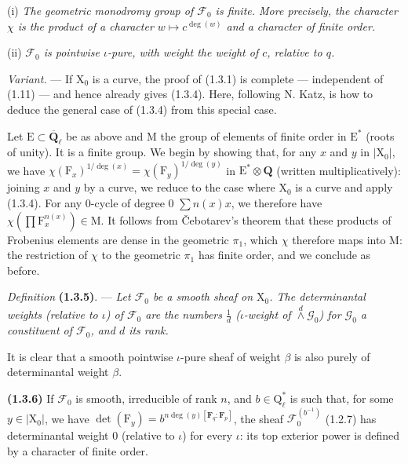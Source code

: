 \documentclass[11pt,leqno]{article}
\begin{document}
(i) \textit{The geometric monodromy group of \(\mathscr{F}_0\) is finite. More precisely, the character \(\chi\) is the product of a character \(w\mapsto c^{\deg(w)}\) and a character of finite order.}

(ii) \textit{\(\mathscr{F}_0\) is pointwise \(\iota\)-pure, with weight the weight of \(c\), relative to \(q\).}

\textit{Variant.} — If \(\mathrm{X}_0\) is a curve, the proof of (1.3.1) is complete — independent of (1.11) — and hence already gives (1.3.4). Here, following N. Katz, is how to deduce the general case of (1.3.4) from this special case.

Let \(\mathrm{E}\subset\overline{\mathbf{Q}}_\ell\) be as above and \(\mathrm{M}\) the group of elements of finite order in \(\mathrm{E}^*\) (roots of unity). It is a finite group. We begin by showing that, for any \(x\) and \(y\) in \(|\mathrm{X}_0|\), we have \(\chi(\mathrm{F}_x)^{1/\deg(x)}=\chi(\mathrm{F}_y)^{1/\deg(y)}\) in \(\mathrm{E}^*\otimes\mathbf{Q}\) (written multiplicatively): joining \(x\) and \(y\) by a curve, we reduce to the case where \(\mathrm{X}_0\) is a curve and apply (1.3.4). For any \(0\)-cycle of degree \(0\) \(\sum n(x)x\), we therefore have \(\chi(\prod\mathrm{F}_x^{n(x)})\in\mathrm{M}\). It follows from Čebotarev's theorem that these products of Frobenius elements are dense in the geometric \(\pi_1\), which \(\chi\) therefore maps into \(\mathrm{M}\): the restriction of \(\chi\) to the geometric \(\pi_1\) has finite order, and we conclude as before.

\textit{Definition} \textbf{(1.3.5)}. — \textit{Let \(\mathscr{F}_0\) be a smooth sheaf on \(\mathrm{X}_0\). The \textup{determinantal weights (relative to \(\iota\))} of \(\mathscr{F}_0\) are the numbers \(\frac{1}{d}\) \textup{(\(\iota\)-weight of \(\overset{d}{\wedge}\mathscr{G}_0\))} for \(\mathscr{G}_0\) a constituent of \(\mathscr{F}_0\), and \(d\) its rank.}

It is clear that a smooth pointwise \(\iota\)-pure sheaf of weight \(\beta\) is also purely of determinantal weight \(\beta\).

\textbf{(1.3.6)} If \(\mathscr{F}_0\) is smooth, irreducible of rank \(n\), and \(b\in\mathrm{Q}_\ell^*\) is such that, for some \(y\in|\mathrm{X}_0|\), we have \(\det(\mathrm{F}_y)=b^{n\deg(y)[\mathbf{F}_q:\mathbf{F}_p]}\), the sheaf \(\mathscr{F}_0^{(b^{-1})}\) (1.2.7) has determinantal weight \(0\) (relative to \(\iota\)) for every \(\iota\): its top exterior power is defined by a character of finite order.
\end{document}
